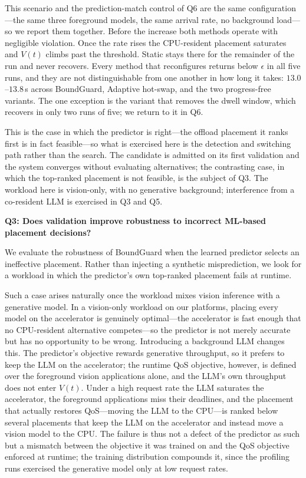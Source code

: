 \documentclass[conference]{IEEEtran}
\begin{document}
{{\color{navyblue}%
\textcolor{navyblue}{This scenario and the prediction-match control of Q6 are the same configuration---the same three foreground models, the same arrival rate, no background load---so we report them together. Before the increase both methods operate with negligible violation. Once the rate rises the CPU-resident placement saturates and $V(t)$ climbs past the threshold. Static stays there for the remainder of the run and never recovers. Every method that reconfigures returns below $\epsilon$ in all five runs, and they are not distinguishable from one another in how long it takes: $13.0$--$13.8$\,s across BoundGuard, Adaptive hot-swap, and the two progress-free variants. The one exception is the variant that removes the dwell window, which recovers in only two runs of five; we return to it in Q6.}

This is the case in which the predictor is right---the offload placement it ranks first is in fact feasible---so what is exercised here is the detection and switching path rather than the search. The candidate is admitted on its first validation and the system converges without evaluating alternatives; the contrasting case, in which the top-ranked placement is not feasible, is the subject of Q3. The workload here is vision-only, with no generative background; interference from a co-resident LLM is exercised in Q3 and Q5.}

\vspace{0.5em}
\noindent\textbf{Q3: Does validation improve robustness to incorrect ML-based placement decisions?}

{\color{navyblue}%
We evaluate the robustness of BoundGuard when the learned predictor selects an ineffective placement. Rather than injecting a synthetic misprediction, we look for a workload in which the predictor's own top-ranked placement fails at runtime.

Such a case arises naturally once the workload mixes vision inference with a generative model. In a vision-only workload on our platforms, placing every model on the accelerator is genuinely optimal---the accelerator is fast enough that no CPU-resident alternative competes---so the predictor is not merely accurate but has no opportunity to be wrong. Introducing a background LLM changes this. The predictor's objective rewards generative throughput, so it prefers to keep the LLM on the accelerator; the runtime QoS objective, however, is defined over the foreground vision applications alone, and the LLM's own throughput does not enter $V(t)$. Under a high request rate the LLM saturates the accelerator, the foreground applications miss their deadlines, and the placement that actually restores QoS---moving the LLM to the CPU---is ranked below several placements that keep the LLM on the accelerator and instead move a vision model to the CPU. The failure is thus not a defect of the predictor as such but a mismatch between the objective it was trained on and the QoS objective enforced at runtime; the training distribution compounds it, since the profiling runs exercised the generative model only at low request rates.

}}
\end{document}
